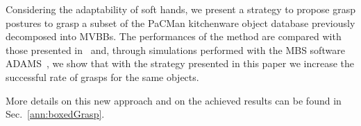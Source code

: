 Considering the adaptability of soft hands, we present a strategy to propose grasp postures to grasp a subset of the PaCMan kitchenware object database previously decomposed into MVBBs. The performances of the method are compared with those presented in~\cite{Bonilla:Humanoids:2015} and, through simulations performed with the MBS software ADAMS\texttrademark~\cite{ADAMS:ONLINE}, we show that with the strategy presented in this paper we increase the successful rate of grasps for the same objects.

More details on this new approach and on the achieved results can be found in Sec.~\ref{ann:boxedGrasp}.%